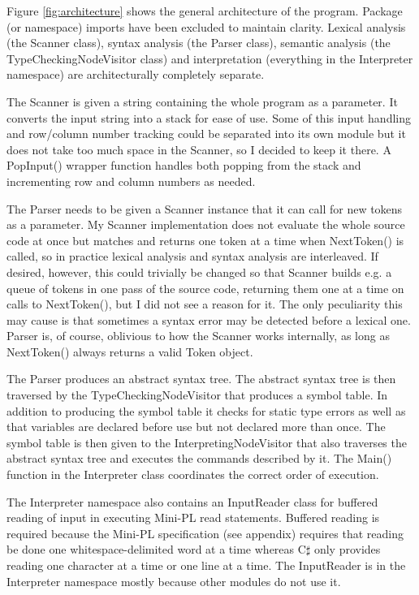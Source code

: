 \documentclass[a4paper,11pt]{article}
\begin{document}
Figure \ref{fig:architecture} shows the general architecture of the program. Package (or namespace) imports have been excluded to maintain clarity. Lexical analysis (the Scanner class), syntax analysis (the Parser class), semantic analysis (the TypeCheckingNodeVisitor class) and interpretation (everything in the Interpreter namespace) are architecturally completely separate.

The Scanner is given a string containing the whole program as a parameter. It converts the input string into a stack for ease of use. Some of this input handling and row/column number tracking could be separated into its own module but it does not take too much space in the Scanner, so I decided to keep it there. A PopInput() wrapper function handles both popping from the stack and incrementing row and column numbers as needed.

The Parser needs to be given a Scanner instance that it can call for new tokens as a parameter. My Scanner implementation does not evaluate the whole source code at once but matches and returns one token at a time when NextToken() is called, so in practice lexical analysis and syntax analysis are interleaved. If desired, however, this could trivially be changed so that Scanner builds e.g. a queue of tokens in one pass of the source code, returning them one at a time on calls to NextToken(), but I did not see a reason for it. The only peculiarity this may cause is that sometimes a syntax error may be detected before a lexical one. Parser is, of course, oblivious to how the Scanner works internally, as long as NextToken() always returns a valid Token object.

The Parser produces an abstract syntax tree. The abstract syntax tree is then traversed by the TypeCheckingNodeVisitor that produces a symbol table. In addition to producing the symbol table it checks for static type errors as well as that variables are declared before use but not declared more than once. The symbol table is then given to the InterpretingNodeVisitor that also traverses the abstract syntax tree and executes the commands described by it. The Main() function in the Interpreter class coordinates the correct order of execution.

The Interpreter namespace also contains an InputReader class for buffered reading of input in executing Mini-PL read statements. Buffered reading is required because the Mini-PL specification (see appendix) requires that reading be done one whitespace-delimited word at a time whereas C$\sharp$ only provides reading one character at a time or one line at a time. The InputReader is in the Interpreter namespace mostly because other modules do not use it.
\end{document}
